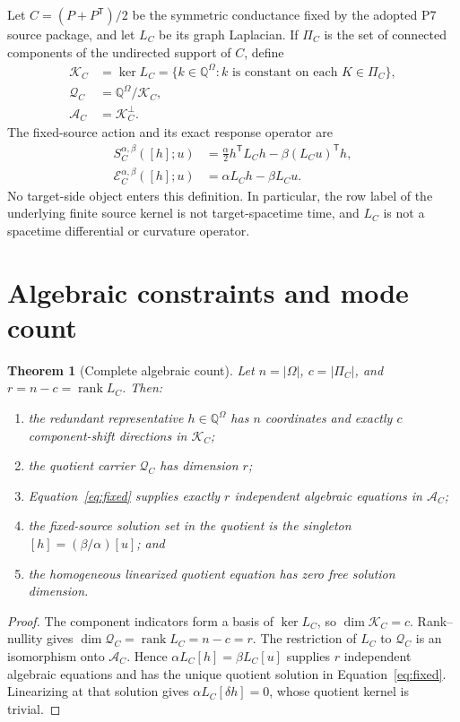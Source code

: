 \documentclass[11pt]{article}
\newtheorem{theorem}{Theorem}
\newcommand{\Q}{\mathbb Q}
\newcommand{\Kspace}{\mathcal K_C}
\newcommand{\Qspace}{\mathcal Q_C}
\newcommand{\Aspace}{\mathcal A_C}
\newcommand{\Eop}{\mathcal E_C^{\alpha,\beta}}
\begin{document}
Let \(C=(P+P^{\mathsf T})/2\) be the symmetric conductance fixed by the
adopted P7 source package, and let \(L_C\) be its graph Laplacian.  If
\(\Pi_C\) is the set of connected components of the undirected support of
\(C\), define
\begin{align}
 \Kspace&=\ker L_C
 =\{k\in\Q^\Omega:k\text{ is constant on each }K\in\Pi_C\},\\
 \Qspace&=\Q^\Omega/\Kspace,\\
 \Aspace&=\Kspace^\perp.
\end{align}
The fixed-source action and its exact response operator are
\begin{align}
 S_C^{\alpha,\beta}([h];u)
 &=\frac{\alpha}{2}h^{\mathsf T}L_Ch
   -\beta(L_Cu)^{\mathsf T}h,\\
 \Eop([h];u)&=\alpha L_Ch-\beta L_Cu.
 \label{eq:action-response}
\end{align}
No target-side object enters this definition.  In particular, the row label
of the underlying finite source kernel is not target-spacetime time, and
\(L_C\) is not a spacetime differential or curvature operator.

\section{Algebraic constraints and mode count}

\begin{theorem}[Complete algebraic count]
\label{thm:count}
Let \(n=|\Omega|\), \(c=|\Pi_C|\), and \(r=n-c=\operatorname{rank}L_C\).
Then:
\begin{enumerate}
 \item the redundant representative \(h\in\Q^\Omega\) has \(n\)
 coordinates and exactly \(c\) component-shift directions in \(\Kspace\);
 \item the quotient carrier \(\Qspace\) has dimension \(r\);
 \item Equation~\eqref{eq:fixed} supplies exactly \(r\) independent
 algebraic equations in \(\Aspace\);
 \item the fixed-source solution set in the quotient is the singleton
 \([h]=(\beta/\alpha)[u]\); and
 \item the homogeneous linearized quotient equation has zero free solution
 dimension.
\end{enumerate}
\end{theorem}

\begin{proof}
The component indicators form a basis of \(\ker L_C\), so
\(\dim\Kspace=c\).  Rank--nullity gives
\(\dim\Qspace=\operatorname{rank}L_C=n-c=r\).  The restriction of \(L_C\)
to \(\Qspace\) is an isomorphism onto \(\Aspace\).  Hence
\(\alpha L_C[h]=\beta L_C[u]\) supplies \(r\) independent algebraic
equations and has the unique quotient solution in
Equation~\eqref{eq:fixed}.  Linearizing at that solution gives
\(\alpha L_C[\delta h]=0\), whose quotient kernel is trivial.
\end{proof}
\end{document}
